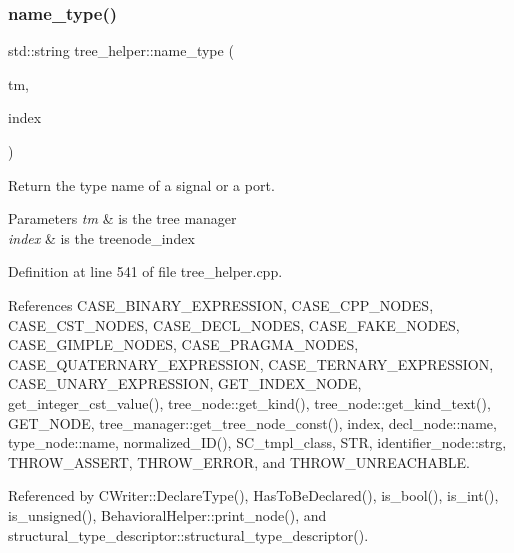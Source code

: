 \subsubsection{\texorpdfstring{name\+\_\+type()}{name\_type()}}
{\footnotesize\ttfamily std\+::string tree\+\_\+helper\+::name\+\_\+type (\begin{DoxyParamCaption}\item[{const \hyperlink{tree__manager_8hpp_a792e3f1f892d7d997a8d8a4a12e39346}{tree\+\_\+manager\+Const\+Ref}}]{tm,  }\item[{const unsigned int}]{index }\end{DoxyParamCaption})\hspace{0.3cm}{\ttfamily [static]}}



Return the type name of a signal or a port. 


\begin{DoxyParams}{Parameters}
{\em tm} & is the tree manager \\
\hline
{\em index} & is the treenode\+\_\+index \\
\hline
\end{DoxyParams}


Definition at line 541 of file tree\+\_\+helper.\+cpp.



References C\+A\+S\+E\+\_\+\+B\+I\+N\+A\+R\+Y\+\_\+\+E\+X\+P\+R\+E\+S\+S\+I\+ON, C\+A\+S\+E\+\_\+\+C\+P\+P\+\_\+\+N\+O\+D\+ES, C\+A\+S\+E\+\_\+\+C\+S\+T\+\_\+\+N\+O\+D\+ES, C\+A\+S\+E\+\_\+\+D\+E\+C\+L\+\_\+\+N\+O\+D\+ES, C\+A\+S\+E\+\_\+\+F\+A\+K\+E\+\_\+\+N\+O\+D\+ES, C\+A\+S\+E\+\_\+\+G\+I\+M\+P\+L\+E\+\_\+\+N\+O\+D\+ES, C\+A\+S\+E\+\_\+\+P\+R\+A\+G\+M\+A\+\_\+\+N\+O\+D\+ES, C\+A\+S\+E\+\_\+\+Q\+U\+A\+T\+E\+R\+N\+A\+R\+Y\+\_\+\+E\+X\+P\+R\+E\+S\+S\+I\+ON, C\+A\+S\+E\+\_\+\+T\+E\+R\+N\+A\+R\+Y\+\_\+\+E\+X\+P\+R\+E\+S\+S\+I\+ON, C\+A\+S\+E\+\_\+\+U\+N\+A\+R\+Y\+\_\+\+E\+X\+P\+R\+E\+S\+S\+I\+ON, G\+E\+T\+\_\+\+I\+N\+D\+E\+X\+\_\+\+N\+O\+DE, get\+\_\+integer\+\_\+cst\+\_\+value(), tree\+\_\+node\+::get\+\_\+kind(), tree\+\_\+node\+::get\+\_\+kind\+\_\+text(), G\+E\+T\+\_\+\+N\+O\+DE, tree\+\_\+manager\+::get\+\_\+tree\+\_\+node\+\_\+const(), index, decl\+\_\+node\+::name, type\+\_\+node\+::name, normalized\+\_\+\+I\+D(), S\+C\+\_\+tmpl\+\_\+class, S\+TR, identifier\+\_\+node\+::strg, T\+H\+R\+O\+W\+\_\+\+A\+S\+S\+E\+RT, T\+H\+R\+O\+W\+\_\+\+E\+R\+R\+OR, and T\+H\+R\+O\+W\+\_\+\+U\+N\+R\+E\+A\+C\+H\+A\+B\+LE.



Referenced by C\+Writer\+::\+Declare\+Type(), Has\+To\+Be\+Declared(), is\+\_\+bool(), is\+\_\+int(), is\+\_\+unsigned(), Behavioral\+Helper\+::print\+\_\+node(), and structural\+\_\+type\+\_\+descriptor\+::structural\+\_\+type\+\_\+descriptor().

